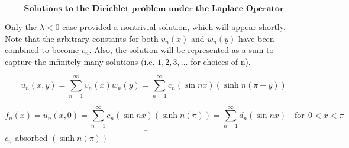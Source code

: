 \documentclass[12pt, a4paper]{article}
\theoremstyle{plain}
\theoremstyle{definition}
\theoremstyle{remark}
\begin{document}
$$\textbf{Solutions to the Dirichlet problem under the Laplace Operator}$$

Only the $\lambda<0$ case provided a nontrivial solution, which will appear shortly. Note that the arbitrary constants for both $v_n(x)$ and $w_n(y)$ have been combined to become $c_n$. Also, the solution will be represented as a sum to capture the infinitely many solutions (i.e. $1, 2, 3, \ldots$ for choices of n).

$$ u_n(x,y) =  \sum_{n=1}^\infty v_n(x)w_n(y) = \sum_{n=1}^\infty c_n(\sin{nx})(\sinh{n(\pi - y)})$$


\vspace{.25in}

$$\underbrace{f_n(x) = u_n(x,0) =  \sum_{n=1}^\infty c_n(\sin{nx})(\sinh{n(\pi)}) = \sum_{n=1}^\infty d_n(\sin{nx})} \quad \text{for} \; \,  0<x< \pi$$
\hspace{1.65in} 
$c_n$ absorbed $(\sinh{n(\pi)})$
\end{document}
